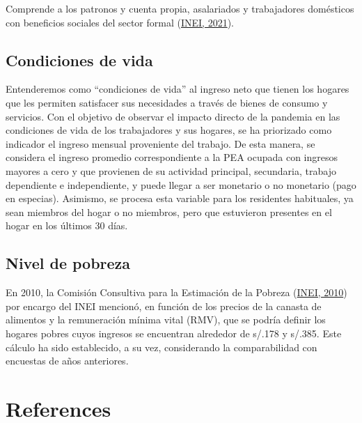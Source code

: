 \documentclass[
  letterpaper,
  12pt,
  oneside,
  spanish,
  doublespacing,
  headsepline,
  parskip]{MastersDoctoralThesis}
\begin{document}
Comprende a los patronos y cuenta propia, asalariados y trabajadores
domésticos con beneficios sociales del sector formal
(\protect\hyperlink{ref-inei2021}{INEI, 2021}).

\hypertarget{condiciones-de-vida}{%
\section{Condiciones de vida}\label{condiciones-de-vida}}

Entenderemos como ``condiciones de vida'' al ingreso neto que tienen los
hogares que les permiten satisfacer sus necesidades a través de bienes
de consumo y servicios. Con el objetivo de observar el impacto directo
de la pandemia en las condiciones de vida de los trabajadores y sus
hogares, se ha priorizado como indicador el ingreso mensual proveniente
del trabajo. De esta manera, se considera el ingreso promedio
correspondiente a la PEA ocupada con ingresos mayores a cero y que
provienen de su actividad principal, secundaria, trabajo dependiente e
independiente, y puede llegar a ser monetario o no monetario (pago en
especias). Asimismo, se procesa esta variable para los residentes
habituales, ya sean miembros del hogar o no miembros, pero que
estuvieron presentes en el hogar en los últimos 30 días.

\hypertarget{nivel-de-pobreza}{%
\section{Nivel de pobreza}\label{nivel-de-pobreza}}

En 2010, la Comisión Consultiva para la Estimación de la Pobreza
(\protect\hyperlink{ref-inei2010}{INEI, 2010}) por encargo del INEI
mencionó, en función de los precios de la canasta de alimentos y la
remuneración mínima vital (RMV), que se podría definir los hogares
pobres cuyos ingresos se encuentran alrededor de s/.178 y s/.385. Este
cálculo ha sido establecido, a su vez, considerando la comparabilidad
con encuestas de años anteriores.


\hypertarget{references}{%
\chapter*{References}\label{references}}

\end{document}
